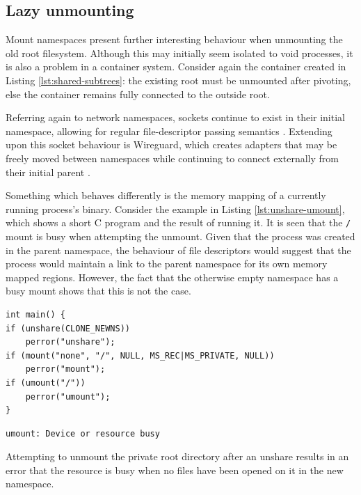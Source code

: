 \documentclass[12pt,a4paper,twoside]{report}
\begin{document}
\subsection{Lazy unmounting}
\label{sec:voiding-mount-lazy-unmount}

Mount namespaces present further interesting behaviour when unmounting the old root filesystem. Although this may initially seem isolated to void processes, it is also a problem in a container system. Consider again the container created in Listing \ref{lst:shared-subtrees}: the existing root must be unmounted after pivoting, else the container remains fully connected to the outside root.

Referring again to network namespaces, sockets continue to exist in their initial namespace, allowing for regular file-descriptor passing semantics \citep{biederman_re_2007}. Extending upon this socket behaviour is Wireguard, which creates adapters that may be freely moved between namespaces while continuing to connect externally from their initial parent \citep[§7.3]{donenfeld_wireguard_2017}.

Something which behaves differently is the memory mapping of a currently running process's binary. Consider the example in Listing \ref{lst:unshare-umount}, which shows a short C program and the result of running it. It is seen that the \texttt{/} mount is busy when attempting the unmount. Given that the process was created in the parent namespace, the behaviour of file descriptors would suggest that the process would maintain a link to the parent namespace for its own memory mapped regions. However, the fact that the otherwise empty namespace has a busy mount shows that this is not the case.

\begin{listing}
\begin{verbatim}
int main() {
if (unshare(CLONE_NEWNS))
	perror("unshare");
if (mount("none", "/", NULL, MS_REC|MS_PRIVATE, NULL))
	perror("mount");
if (umount("/"))
	perror("umount");
}
\end{verbatim}
\begin{verbatim}
umount: Device or resource busy
\end{verbatim}

\caption{Attempting to unmount the private root directory after an unshare results in an error that the resource is busy when no files have been opened on it in the new namespace.}
\label{lst:unshare-umount}
\end{listing}
\end{document}
